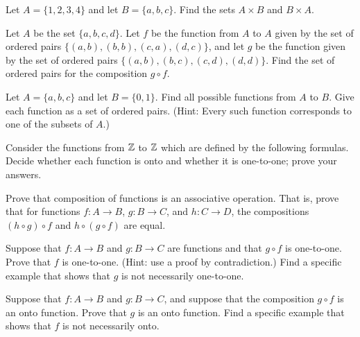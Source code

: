\begin{exercises}

\problem Let $A=\{1,2,3,4\}$ and let $B=\{a,b,c\}$.
Find the sets $A\times B$ and $B\times A$.

\problem Let $A$ be the set $\{a,b,c,d\}$.  Let $f$ be the
function from $A$ to $A$ given by the set of ordered pairs
$\{(a,b),(b,b),(c,a),(d,c)\}$, and let $g$ be the function
given by the set of ordered pairs $\{(a,b),(b,c),(c,d),(d,d)\}$.
Find the set of ordered pairs for the composition $g\circ f$.

\problem Let $A=\{a,b,c\}$ and let $B=\{0,1\}$.  Find all
possible functions from $A$ to $B$.  Give each function as
a set of ordered pairs.  (Hint: Every such function corresponds
to one of the subsets of $A$.)

\problem Consider the functions from ${\mathbb Z}$ to ${\mathbb Z}$ which are
defined by the following formulas.  Decide whether each
function is onto and whether it is one-to-one; prove your answers.  

\problem Prove that composition of functions is an associative
operation.  That is, prove that for functions
$f\colon A\to B$, $g\colon B\to C$, and $h\colon C\to D$,
the compositions $(h\circ g)\circ f$ and $h\circ(g\circ f)$
are equal.

\problem 
Suppose that $f\colon A\to B$ and $g\colon B\to C$ are
functions and that $g\circ f$ is one-to-one.  
\ppart Prove that $f$ is one-to-one. (Hint: use a proof by contradiction.)
\ppart Find
a specific example that shows that $g$ is not necessarily
one-to-one.

\problem Suppose that $f\colon A\to B$ and $g\colon B\to C$,
and suppose that the composition $g\circ f$ is an onto
function.  
\ppart Prove that $g$ is an onto function.  
\ppart Find
a specific example that shows that $f$ is not necessarily
onto.



\end{exercises}



